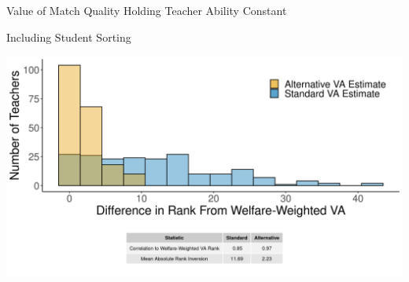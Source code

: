 \documentclass[11pt]{beamer}
\begin{document}
\begin{frame}{Value of Match Quality Holding Teacher Ability Constant}

\end{frame}



\begin{frame}{Including Student Sorting}

    \includegraphics[width=\textwidth]{slides/Figures/np_hist_run_14.png}

\end{frame}


\end{document}
